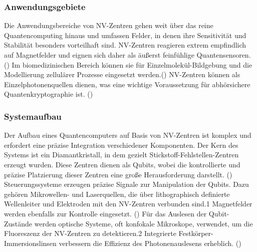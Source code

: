 \subsubsection{Anwendungsgebiete}
Die Anwendungsbereiche von NV-Zentren gehen weit über das reine Quantencomputing hinaus und umfassen Felder, in denen ihre Sensitivität und Stabilität besonders vorteilhaft sind. NV-Zentren reagieren extrem empfindlich auf Magnetfelder und eignen sich daher als äußerst feinfühlige Quantensensoren. (\cite{NVZentrenStickstoffFehlstellenDLR}) Im biomedizinischen Bereich können sie für Einzelmolekül-Bildgebung und die Modellierung zellulärer Prozesse eingesetzt werden.(\cite{NitrogenvacancyCenter2025}) NV-Zentren können als Einzelphotonenquellen dienen, was eine wichtige Voraussetzung für abhörsichere Quantenkryptographie ist. (\cite{ein_quantencomputer_in_diamant})
\subsubsection{Systemaufbau}
Der Aufbau eines Quantencomputers auf Basis von NV-Zentren ist komplex und erfordert eine präzise Integration verschiedener Komponenten.
Der Kern des Systems ist ein Diamantkristall, in dem gezielt Stickstoff-Fehlstellen-Zentren erzeugt wurden. Diese Zentren dienen als Qubits, wobei die kontrollierte und präzise Platzierung dieser Zentren eine große Herausforderung darstellt. (\cite{ein_quantencomputer_in_diamant})
Steuerungssysteme erzeugen präzise Signale zur Manipulation der Qubits. Dazu gehören Mikrowellen- und Laserquellen, die über lithographisch definierte Wellenleiter und Elektroden mit den NV-Zentren verbunden sind.1 Magnetfelder werden ebenfalls zur Kontrolle eingesetzt. (\cite{gmbhCCGFachartikelQuantencomputer2025})
Für das Auslesen der Qubit-Zustände werden optische Systeme, oft konfokale Mikroskope, verwendet, um die Fluoreszenz der NV-Zentren zu detektieren.2 Integrierte Festkörper-Immersionslinsen verbessern die Effizienz des Photonenauslesens erheblich. (\cite{childressDiamondNVCenters2013a})

